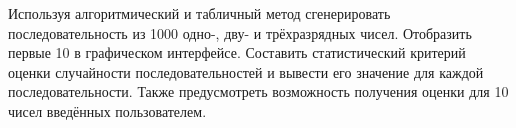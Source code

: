 Используя алгоритмический и табличный метод сгенерировать последовательность из 1000 одно-, дву- и трёхразрядных чисел. Отобразить первые 10 в графическом интерфейсе. Составить статистический критерий оценки случайности последовательностей и вывести его значение для каждой последовательности. Также предусмотреть возможность получения оценки для 10 чисел введённых пользователем. 